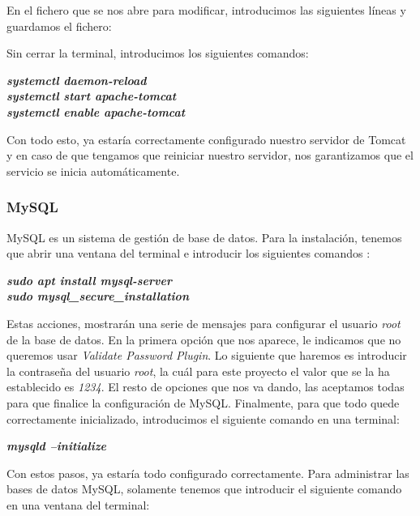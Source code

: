 En el fichero que se nos abre para modificar, introducimos las siguientes líneas y guardamos el fichero:


Sin cerrar la terminal, introducimos los siguientes comandos:

\begin{center}
	\textbf{\textit{
	systemctl daemon-reload \\
	systemctl start apache-tomcat \\
	systemctl enable apache-tomcat \\
	}}
\end{center}

Con todo esto, ya estaría correctamente configurado nuestro servidor de Tomcat y en caso de que tengamos que reiniciar nuestro servidor, nos garantizamos que el servicio se inicia automáticamente.

\subsubsection{MySQL}

MySQL es un sistema de gestión de base de datos. Para la instalación, tenemos que abrir una ventana del terminal e introducir los siguientes comandos \cite{mysql:install}:

\begin{center}
	\textbf{\textit{
			sudo apt install mysql-server \\
			sudo mysql\_secure\_installation \\
	}}
\end{center}

Estas acciones, mostrarán una serie de mensajes para configurar el usuario \textit{root} de la base de datos. En la primera opción que nos aparece, le indicamos que no queremos usar \textit{Validate Password Plugin}. Lo siguiente que haremos es introducir la contraseña del usuario \textit{root}, la cuál para este proyecto el valor que se la ha establecido es \textit{1234}. El resto de opciones que nos va dando, las aceptamos todas para que finalice la configuración de MySQL. Finalmente, para que todo quede correctamente inicializado, introducimos el siguiente comando en una terminal:
\begin{center}
	\textbf{\textit{mysqld --initialize}}
\end{center}

Con estos pasos, ya estaría todo configurado correctamente. Para administrar las bases de datos MySQL, solamente tenemos que introducir el siguiente comando en una ventana del terminal:

